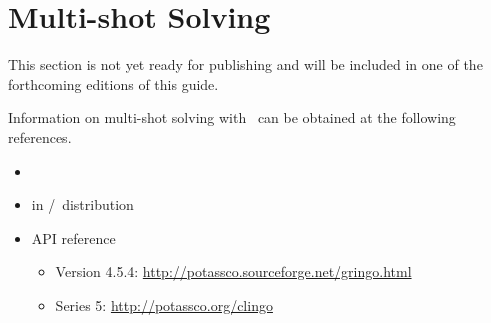 \section{Multi-shot Solving}\label{sec:multi}

This section is not yet ready for publishing
and will be included in one of the forthcoming editions of this guide.

Information on multi-shot solving with \clingo\ can be obtained at the following references.

\begin{itemize}
\item \cite{kascwa17a,gekakasc17a}
\item {} in \gringo/\clingo\ distribution
\item API reference
  \begin{itemize}
  \item Version 4.5.4:  \url{http://potassco.sourceforge.net/gringo.html}
  \item Series 5:       \url{http://potassco.org/clingo}
  \end{itemize}
\end{itemize}



% 

% 


